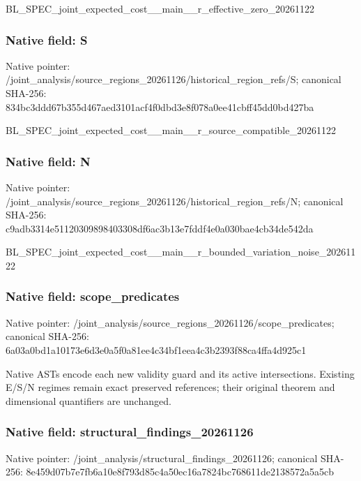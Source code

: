 \documentclass[10pt,a4paper]{article}
\begin{document}
BL\_SPEC\_joint\_expected\_c\allowbreak{}ost\_\_main\_\_r\_effective\_z\allowbreak{}ero\_20261122


\subsubsection{Native field: S}


Native pointer: /joint\_analysis/source\_r\allowbreak{}egions\_20261126/historic\allowbreak{}al\_region\_refs/S; canonical SHA-256: 834bc3ddd67b355d467aed31\allowbreak{}01acf4f0dbd3e8f078a0ee41\allowbreak{}cbff45dd0bd427ba


BL\_SPEC\_joint\_expected\_c\allowbreak{}ost\_\_main\_\_r\_source\_comp\allowbreak{}atible\_20261122


\subsubsection{Native field: N}


Native pointer: /joint\_analysis/source\_r\allowbreak{}egions\_20261126/historic\allowbreak{}al\_region\_refs/N; canonical SHA-256: c9adb3314e51120309898403\allowbreak{}308df6ac3b13e7fddf4e0a03\allowbreak{}0bae4cb34de542da


BL\_SPEC\_joint\_expected\_c\allowbreak{}ost\_\_main\_\_r\_bounded\_var\allowbreak{}iation\_noise\_20261122


\subsubsection{Native field: scope\_predicates}


Native pointer: /joint\_analysis/source\_r\allowbreak{}egions\_20261126/scope\_pr\allowbreak{}edicates; canonical SHA-256: 6a03a0bd1a10173e6d3e0a5f\allowbreak{}0a81ee4c34bf1eea4c3b2393\allowbreak{}f88ca4ffa4d925c1


Native ASTs encode each new validity guard and its active intersections. Existing E/S/N regimes remain exact preserved references; their original theorem and dimensional quantifiers are unchanged.


\subsubsection{Native field: structural\_findings\_20261126}


Native pointer: /joint\_analysis/structur\allowbreak{}al\_findings\_20261126; canonical SHA-256: 8e459d07b7e7fb6a10e8f793\allowbreak{}d85c4a50ec16a7824bc76861\allowbreak{}1de2138572a5a5cb
\end{document}
